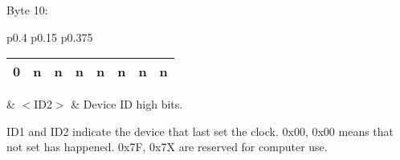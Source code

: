Byte 10:

\begin{tabular}{p{0.4\linewidth} p{0.15\linewidth} p{0.375\linewidth}} 

\begin{tabular}{|p{0.3cm}|p{0.3cm}|p{0.3cm}|p{0.3cm}|p{0.3cm}|p{0.3cm}|p{0.3cm}|p{0.3cm}|}
\hline
0 & n & n & n & n & n & n & n\\
\hline
\end{tabular}
& $<$ID2$>$ & Device ID high bits.\\
\end{tabular}

ID1 and ID2 indicate the device that last set the clock. 0x00, 0x00 means that not set has happened. 0x7F, 0x7X are reserved for computer use.




